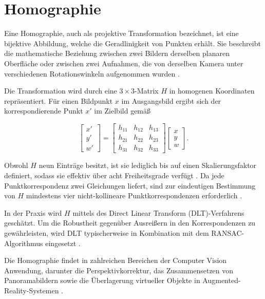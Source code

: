 \section{Homographie}

Eine Homographie, auch als projektive Transformation bezeichnet, ist eine bijektive Abbildung, welche die Geradlinigkeit von Punkten erhält. Sie beschreibt die mathematische Beziehung zwischen zwei Bildern derselben planaren Oberfläche oder 
zwischen zwei Aufnahmen, die von derselben Kamera unter verschiedenen Rotationswinkeln aufgenommen wurden \cite{szeliski_computer_2022}.

Die Transformation wird durch eine $3 \times 3$-Matrix $H$ in homogenen Koordinaten repräsentiert. Für einen Bildpunkt $x$ im Ausgangsbild ergibt sich der korrespondierende Punkt $x'$ im Zielbild gemäß

\[
\begin{bmatrix} x' \\ y' \\ w' \end{bmatrix}
=
\begin{bmatrix} h_{11} & h_{12} & h_{13} \\ h_{21} & h_{22} & h_{23} \\ 
h_{31} & h_{32} & h_{33} \end{bmatrix}
\begin{bmatrix} x \\ y \\ w \end{bmatrix}.
\]

Obwohl $H$ neun Einträge besitzt, ist sie lediglich bis auf einen Skalierungsfaktor definiert, sodass sie effektiv über acht Freiheitsgrade verfügt \cite{opencv}. Da jede Punktkorrespondenz zwei Gleichungen liefert, sind zur eindeutigen Bestimmung von $H$ mindestens vier nicht-kollineare Punktkorrespondenzen erforderlich \cite{szeliski_computer_2022}.

In der Praxis wird $H$ mittels des Direct Linear Transform (DLT)-Verfahrens geschätzt. Um die Robustheit gegenüber Ausreißern in den Korrespondenzen zu gewährleisten, wird DLT typischerweise in Kombination mit dem RANSAC-Algorithmus eingesetzt \cite{opencv}.

Die Homographie findet in zahlreichen Bereichen der Computer Vision Anwendung, darunter die Perspektivkorrektur, das Zusammensetzen von Panoramabildern sowie die Überlagerung virtueller Objekte in Augmented-Reality-Systemen \cite{szeliski_computer_2022, opencv}.

